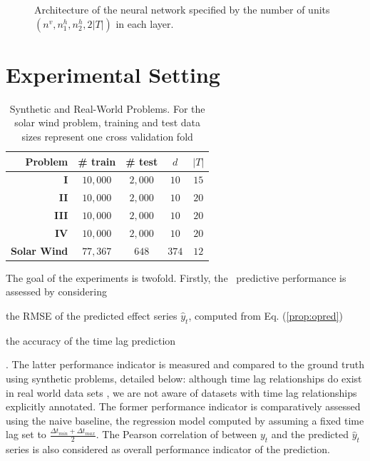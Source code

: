 \begin{figure}[ht]
\centerline{\resizebox*{0.7\textwidth}{!}{}}
\caption{\label{fig:archi} Architecture of the neural network specified by the number of units 
$(n^v,n_1^h,n_2^h,2\vert T\vert)$ in each layer.}
\label{fig:NN}
\end{figure}

\section{Experimental Setting}\label{sec:pdtExp}

\begin{table}[ht]
  \caption{
    Synthetic and Real-World Problems. 
    For the solar wind problem, training and test data sizes represent one cross validation fold}
  \label{tab:exp_data_info}
  \centering
  \begin{tabular}{ r c c c c}
  \hline
  Problem &  \# train & \# test & $d$ & $|T|$ \\
  \hline
  \textbf{I} & $10,000$ & $2,000$  & $10$ & $15$\\
  \textbf{II} & $10,000$ & $2,000$ & $10$ & $20$\\
  \textbf{III} & $10,000$ & $2,000$ & $10$ & $20$\\
  \textbf{IV} & $10,000$ & $2,000$ & $10$ & $20$\\
  \textbf{Solar Wind} & $77,367$ & $648$ & $374$ & $12$\\
  \hline
  \end{tabular}
\end{table}

The goal of the experiments is twofold. Firstly, the \XX\ predictive performance is assessed by 
considering 
%
\begin{enumerate*} 
  \item the RMSE of the predicted effect series $\hat y_t$, computed from Eq. (\ref{prop:opred})  
  \item the accuracy of the time lag prediction 
\end{enumerate*}. 
%
The latter performance indicator is measured and compared to the ground truth using synthetic 
problems, detailed below: although time lag relationships do exist in real world data sets 
\citep{doi:10.1002/jgra.50429,ZHOU2006195}, we are not aware of datasets with time lag 
relationships explicitly annotated. The former performance indicator is comparatively assessed 
using the naive baseline, the regression model computed by assuming a fixed time lag set to 
$\frac{\Delta t_{min} + \Delta t_{max}}{2}$. The Pearson correlation of between $y_t$ and 
the predicted $\hat y_t$ series is also considered as overall performance indicator of the prediction.

